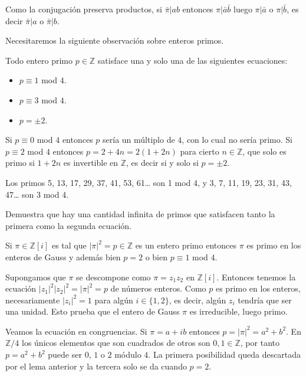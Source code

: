 
Como la conjugación preserva productos, si \(\bar\pi|ab\) entonces
\(\pi|\bar a\bar b\) luego \(\pi|\bar a\) o \(\pi|\bar b\), es decir
\(\bar\pi|a\) o \(\bar\pi|b\). 

Necesitaremos la siguiente observación sobre enteros primos.


Todo entero primo \(p\in\mathbb Z\) satisface una y solo una de las
siguientes ecuaciones:

\begin{itemize}
\item
  \(p\equiv 1\) mod \(4\).
\item
  \(p\equiv 3\) mod \(4\).
\item
  \(p=\pm2\).
\end{itemize}



Si \(p\equiv 0\) mod \(4\) entonces \(p\) sería un múltiplo de \(4\),
con lo cual no sería primo. Si \(p\equiv 2\) mod \(4\) entonces
\(p=2+4n=2(1+2n)\) para cierto \(n\in\mathbb Z\), que solo es primo si
\(1+2n\) es invertible en \(\mathbb Z\), es decir si y solo si
\(p=\pm2\). 

Los primos 5, 13, 17, 29, 37, 41, 53, 61\ldots{} son 1 mod 4, y 3, 7,
11, 19, 23, 31, 43, 47\ldots{} son 3 mod 4.


Demuestra que hay una cantidad infinita de primos que satisfacen tanto
la primera como la segunda ecuación. 


Si \(\pi\in\mathbb Z[i]\) es tal que \(|\pi|^2=p\in\mathbb Z\) es un
entero primo entonces \(\pi\) es primo en los enteros de Gauss y además
bien \(p=2\) o bien \(p\equiv 1\) mod \(4\). 


Supongamos que \(\pi\) se descompone como \(\pi=z_1z_2\) en
\(\mathbb Z[i]\). Entonces tenemos la ecuación
\(|z_1|^2|z_2|^2=|\pi|^2=p\) de números enteros. Como \(p\) es primo en
los enteros, necesariamente \(|z_i|^2=1\) para algún \(i\in\{1,2\}\),
es decir, algún \(z_i\) tendría que ser una unidad. Esto prueba que el
entero de Gauss \(\pi\) es irreducible, luego primo.

Veamos la ecuación en congruencias. Si \(\pi=a+ib\) entonces
\(p=|\pi|^2=a^2+b^2\). En \(\mathbb Z/4\) los únicos elementos que son
cuadrados de otros son \(0,1\in\mathbb Z\), por tanto \(p=a^2+b^2\)
puede ser \(0\), \(1\) o \(2\) módulo \(4\). La primera posibilidad
queda descartada por el lema anterior y la tercera solo se da cuando
\(p=2\). 

